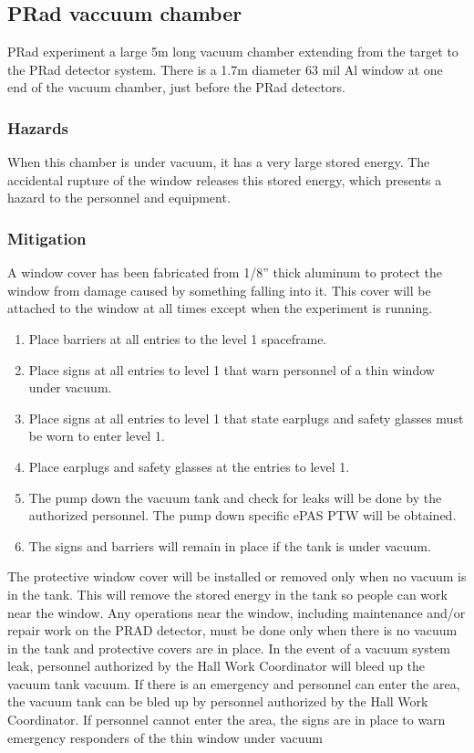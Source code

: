 \subsection{PRad vaccuum chamber}
PRad experiment a large 5m long vacuum chamber extending from the target to the PRad detector system. 
There is a 1.7m diameter 63 mil Al window at one end of the vacuum chamber, just before the PRad detectors. 

\subsubsection{Hazards}
When this chamber is under vacuum, it has a very large stored energy. 
The accidental rupture of the window releases this stored energy, which presents a hazard to the personnel and equipment.

\subsubsection{Mitigation}

A window cover has been fabricated from 1/8” thick aluminum to protect the window from damage caused by something falling into it. This cover will be attached to the window at all times except when the experiment is running.  
\begin{enumerate}
\item Place barriers at all entries to the level 1 spaceframe.
\item Place signs at all entries to level 1 that warn personnel of a thin window under vacuum.
\item Place signs at all entries to level 1 that state earplugs and safety glasses must be worn to enter level 1.
\item Place earplugs and safety glasses at the entries to level 1.
\item The pump down the vacuum tank and check for leaks will be done by the authorized personnel. The pump down specific ePAS PTW will be obtained.
\item The signs and barriers will remain in place if the tank is under vacuum.
\end{enumerate}

The protective window cover will be installed or removed only when no vacuum is in the tank.  This will remove the stored energy in the tank so people can work near the window.  
Any operations near the window, including maintenance and/or repair work on the PRAD detector, must be done only when there is no vacuum in the tank and protective covers are in place.
In the event of a vacuum system leak, personnel authorized by the Hall Work Coordinator will bleed up the vacuum tank vacuum.
If there is an emergency and personnel can enter the area, the vacuum tank can be bled up by personnel authorized by the Hall Work Coordinator.  If personnel cannot enter the area, the signs are in place to warn emergency responders of the thin window under vacuum
